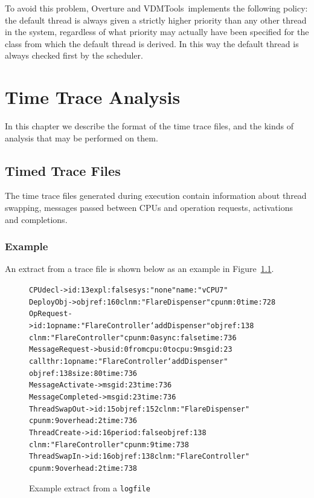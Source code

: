 \documentclass{overturerepchap}
\newcommand{\vdmtools}{VDMTools}
\begin{document}
To avoid this problem, Overture and \vdmtools\ implements the following policy:
the default thread is always given a strictly higher priority than any
other thread in the system, regardless of what priority may actually
have been specified for the class from which the default thread is
derived. In this way the default thread is always checked first by the
scheduler.

\chapter{Time Trace Analysis}\label{chap:timetrace}

In this chapter we describe the format of the time trace files, and
the kinds of analysis that may be performed on them.

\section{Timed Trace Files}

The time trace files generated during execution contain information
about thread swapping, messages passed between CPUs and operation
requests, activations and completions.

\subsection{Example}

An extract from a trace file is shown below as an example in Figure~\ref{fig:examplelogfile}. 

\begin{figure}
{\small
\begin{alltt}
CPUdecl ->  id: 13 expl: false sys: "none" name: "vCPU 7"
DeployObj ->  objref: 160 clnm: "FlareDispenser" cpunm: 0 time: 728
OpRequest -> id: 1 opname: "FlareController`addDispenser" objref: 138 
             clnm: "FlareController" cpunm: 0 async: false time: 736
MessageRequest -> busid: 0 fromcpu: 0 tocpu: 9 msgid: 23 
                  callthr: 1 opname: "FlareController`addDispenser" 
                  objref: 138 size: 80 time: 736
MessageActivate -> msgid: 23 time: 736
MessageCompleted -> msgid: 23 time: 736
ThreadSwapOut -> id: 15 objref: 152 clnm: "FlareDispenser" 
                 cpunm: 9 overhead: 2 time: 736
ThreadCreate -> id: 16 period: false objref: 138 
                clnm: "FlareController" cpunm: 9 time: 738
ThreadSwapIn -> id: 16 objref: 138 clnm: "FlareController" 
                cpunm: 9 overhead: 2 time: 738
\end{alltt}
}
\caption{Example extract from a \texttt{logfile}\label{fig:examplelogfile}}
\end{figure}
\end{document}
